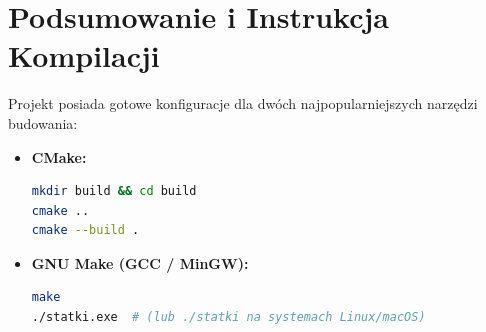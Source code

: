 \documentclass[11pt,a4paper]{article}
\begin{document}
\section{Podsumowanie i Instrukcja Kompilacji}
Projekt posiada gotowe konfiguracje dla dwóch najpopularniejszych narzędzi budowania:
\begin{itemize}
    \item \textbf{CMake:}
    \begin{lstlisting}[language=bash]
mkdir build && cd build
cmake ..
cmake --build .
    \end{lstlisting}
    \item \textbf{GNU Make (GCC / MinGW):}
    \begin{lstlisting}[language=bash]
make
./statki.exe  # (lub ./statki na systemach Linux/macOS)
    \end{lstlisting}
\end{itemize}
\end{document}
